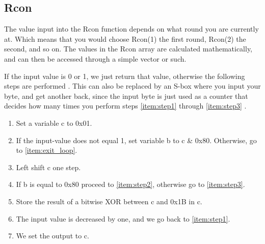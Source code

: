  \subsection{Rcon} \label{ch:Rcon}
The value input into the Rcon function depends on what round you are currently 
at. Which means that you would choose Rcon(1) the first round, Rcon(2) the 
second, and so on. The values in the Rcon array are calculated mathematically, 
and can then be accessed through a simple vector or such.


If the input value is 0 or 1, we just return that value, otherwise the 
following steps are performed \citep{RijndaelKeySchedule}. This can also be 
replaced by an S-box where you input your byte, and get another back, since the 
input byte is just used as a counter that decides how many times you perform 
steps \ref{item:step1} through \ref{item:step3} 
.

\begin{enumerate}
\item Set a variable c to 0x01.
\item If the input-value does not equal 1, set variable b to c \& 0x80. 
Otherwise, go to \ref{item:exit_loop}. 
\label{item:step1}
\item Left shift c one step.
\item If b is equal to 0x80 proceed to \ref{item:step2}, otherwise go to 
\ref{item:step3}.
\item Store the result of a bitwise XOR between c and 0x1B in c.
\label{item:step2}
\item The input value is decreased by one, and we go back to \ref{item:step1}.
\label{item:step3}
\item We set the output to c.
\label{item:exit_loop}
\end{enumerate}
